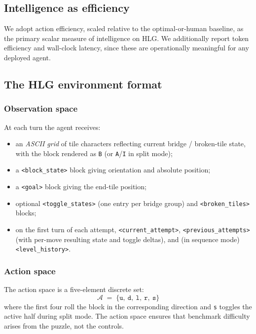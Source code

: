 \subsection{Intelligence as efficiency}
\label{sec:efficiency}

We adopt action efficiency, scaled relative to the optimal-or-human baseline, as the
primary scalar measure of intelligence on HLG. We additionally report token efficiency
and wall-clock latency, since these are operationally meaningful for any deployed agent.

\subsection{The HLG environment format}
\label{sec:format}

\subsubsection{Observation space}
\label{sec:obs}

At each turn the agent receives:
\begin{itemize}[leftmargin=1.5em]
    \item an \emph{ASCII grid} of tile characters reflecting current bridge / broken-tile
      state, with the block rendered as \texttt{B} (or \texttt{A}/\texttt{I} in split
      mode);
    \item a \texttt{<block\_state>} block giving orientation and absolute position;
    \item a \texttt{<goal>} block giving the end-tile position;
    \item optional \texttt{<toggle\_states>} (one entry per bridge group) and
      \texttt{<broken\_tiles>} blocks;
    \item on the first turn of each attempt, \texttt{<current\_attempt>},
      \texttt{<previous\_attempts>} (with per-move resulting state and toggle deltas),
      and (in sequence mode) \texttt{<level\_history>}.
\end{itemize}

\subsubsection{Action space}
\label{sec:actions}

The action space is a five-element discrete set:
\[
\mathcal{A} \;=\; \{ \texttt{u},\ \texttt{d},\ \texttt{l},\ \texttt{r},\ \texttt{s} \}
\]
where the first four roll the block in the corresponding direction and \texttt{s}
toggles the active half during split mode. The action space ensures that benchmark
difficulty arises from the puzzle, not the controls.

